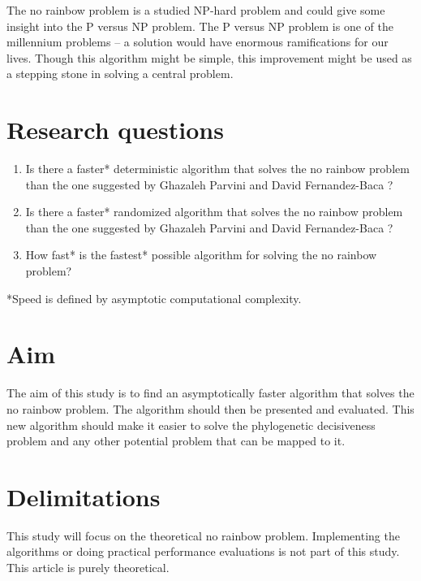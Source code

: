 \documentclass[msc,lith,english]{liuthesis}
\begin{document}
The no rainbow problem is a studied NP-hard problem and could give some insight into the P versus NP problem.
The P versus NP problem is one of the millennium problems -- a solution would have enormous ramifications for our lives.
Though this algorithm might be simple, this improvement might be used as a
stepping stone in solving a central problem.


\section{Research questions}
\begin{enumerate}
  \item Is there a faster* deterministic algorithm that solves the no rainbow problem than the one suggested by Ghazaleh Parvini and David Fernandez-Baca \cite{sourceNoRainbow}?
  \item Is there a faster* randomized algorithm that solves the no rainbow problem than the one suggested by Ghazaleh Parvini and David Fernandez-Baca \cite{sourceNoRainbow}?
  \item How fast* is the fastest* possible algorithm for solving the no rainbow problem? 
\end{enumerate}
*Speed is defined by asymptotic computational complexity.

\section{Aim}
The aim of this study is to find an asymptotically faster algorithm that solves
the no rainbow problem. The algorithm should then be presented and evaluated.
This new algorithm should make it easier to solve the phylogenetic decisiveness
problem and any other potential problem that can be mapped to it.

\section{Delimitations}
This study will focus on the theoretical no rainbow problem.
Implementing the algorithms or doing practical performance evaluations is not part of this study.
This article is purely theoretical.
\end{document}
